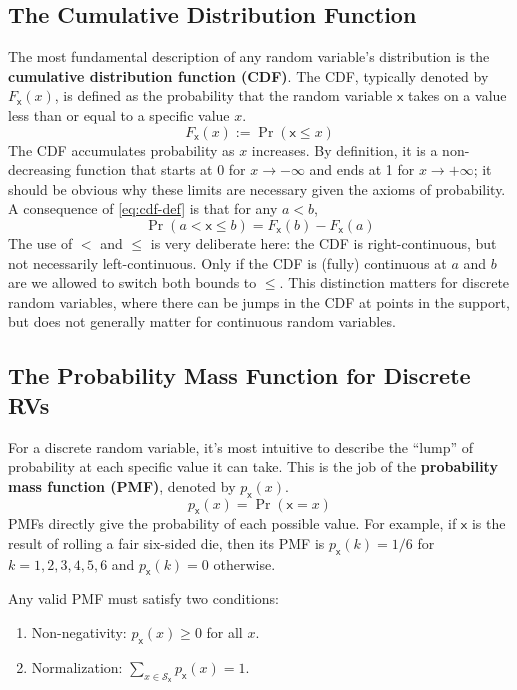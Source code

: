 \subsection{The Cumulative Distribution Function}
The most fundamental description of any random variable's distribution is the \textbf{cumulative distribution function (CDF)}. The CDF, typically denoted by $F_{\mathsf{x}}(x)$, is defined as the probability that the random variable $\mathsf{x}$ takes on a value less than or equal to a specific value $x$.
\begin{equation}
    F_{\mathsf{x}}(x) := \Pr(\mathsf{x} \le x)
    \label{eq:cdf-def}
\end{equation}
The CDF accumulates probability as $x$ increases. By definition, it is a non-decreasing function that starts at 0 for $x \to -\infty$ and ends at 1 for $x \to +\infty$; it should be obvious why these limits are necessary given the axioms of probability. A consequence of \autoref{eq:cdf-def} is that for any $a<b$,
\begin{equation}
    \Pr(a<\mathsf{x}\le b)=F_{\mathsf{x}}(b)-F_{\mathsf{x}}(a)
    \label{eq:cdf-range}
\end{equation}
The use of $<$ and $\le$ is very deliberate here: the CDF is right-continuous, but not necessarily left-continuous. Only if the CDF is (fully) continuous at $a$ and $b$ are we allowed to switch both bounds to $\le$. This distinction matters for discrete random variables, where there can be jumps in the CDF at points in the support, but does not generally matter for continuous random variables.

\subsection{The Probability Mass Function for Discrete RVs}
For a discrete random variable, it's most intuitive to describe the ``lump'' of probability at each specific value it can take. This is the job of the \textbf{probability mass function (PMF)}, denoted by $p_{\mathsf{x}}(x)$.
\begin{equation}
    p_{\mathsf{x}}(x) = \Pr(\mathsf{x} = x)
    \label{eq:pmf-def}
\end{equation}
PMFs directly give the probability of each possible value. For example, if $\mathsf{x}$ is the result of rolling a fair six-sided die, then its PMF is $p_{\mathsf{x}}(k) = 1/6$ for $k=1,2,3,4,5,6$ and $p_{\mathsf{x}}(k) = 0$ otherwise.


Any valid PMF must satisfy two conditions:
\begin{enumerate}
    \item Non-negativity: $p_{\mathsf{x}}(x) \ge 0$ for all $x$.
    \item Normalization: $\sum_{x \in \mathcal{S}_{\mathsf{x}}} p_{\mathsf{x}}(x) = 1$.
\end{enumerate}

